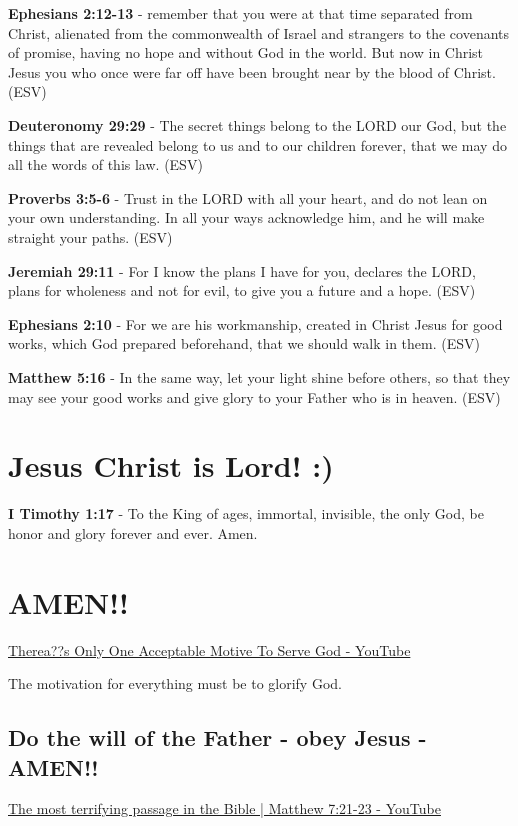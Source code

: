 \documentclass[11pt]{article}
\begin{document}
\textbf{Ephesians 2:12-13} -  remember that you were at that time separated from Christ, alienated from the commonwealth of Israel and strangers to the covenants of promise, having no hope and without God in the world.  But now in Christ Jesus you who once were far off have been brought near by the blood of Christ.  (ESV)

\textbf{Deuteronomy 29:29} -  The secret things belong to the LORD our God, but the things that are revealed belong to us and to our children forever, that we may do all the words of this law.  (ESV)

\textbf{Proverbs 3:5-6} - Trust in the LORD with all your heart, and do not lean on your own understanding. In all your ways acknowledge him, and he will make straight your paths. (ESV)

\textbf{Jeremiah 29:11} -  For I know the plans I have for you, declares the LORD, plans for wholeness and not for evil, to give you a future and a hope.  (ESV)

\textbf{Ephesians 2:10} - For we are his workmanship, created in Christ Jesus for good works, which God prepared beforehand, that we should walk in them. (ESV)

\textbf{Matthew 5:16} - In the same way, let your light shine before others, so that they may see your good works and give glory to your Father who is in heaven. (ESV)

\section{Jesus Christ is Lord! :)}
\label{sec:org9b816db}
\textbf{I Timothy 1:17} - To the King of ages, immortal, invisible, the only God, be honor and glory forever and ever. Amen.

\section{AMEN!!}
\label{sec:orgef8c3d1}
\href{https://www.youtube.com/watch?v=TEa3UWFgwnk}{Therea??s Only One Acceptable Motive To Serve God - YouTube}

The motivation for everything must be to glorify God.

\subsection{Do the will of the Father - obey Jesus - AMEN!!}
\label{sec:org2ab02ef}

\href{https://www.youtube.com/watch?v=v60efH7\_POE\&t=616s}{The most terrifying passage in the Bible | Matthew 7:21-23 - YouTube}
\end{document}
